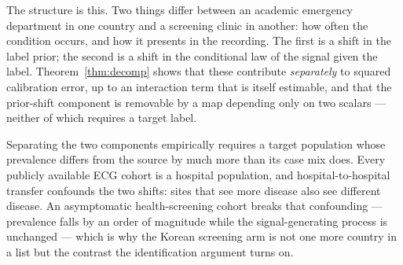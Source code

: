 \documentclass[11pt]{article}
\theoremstyle{plain}
\theoremstyle{definition}
\theoremstyle{remark}
\begin{document}
The structure is this.  Two things differ between an academic emergency
department in one country and a screening clinic in another: how often the
condition occurs, and how it presents in the recording.  The first is a shift
in the label prior; the second is a shift in the conditional law of the signal
given the label.  Theorem~\ref{thm:decomp} shows that these contribute
\emph{separately} to squared calibration error, up to an interaction term that
is itself estimable, and that the prior-shift component is removable by a map
depending only on two scalars --- neither of which requires a target label.

Separating the two components empirically requires a target population whose
prevalence differs from the source by much more than its case mix does.  Every
publicly available ECG cohort is a hospital population, and hospital-to-hospital
transfer confounds the two shifts: sites that see more disease also see
different disease.  An asymptomatic health-screening cohort breaks that
confounding --- prevalence falls by an order of magnitude while the
signal-generating process is unchanged --- which is why the Korean screening
arm is not one more country in a list but the contrast the identification
argument turns on.

\end{document}
